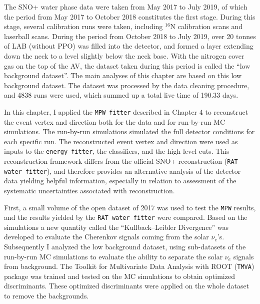 
The SNO+ water phase data were taken from May 2017 to July 2019, of which the period from May 2017 to October 2018 constitutes the first stage. During this stage, several calibration runs were taken, including $^{16}$N calibration scans and laserball scans. During the period from October 2018 to July 2019, over 20 tonnes of LAB (without PPO) was filled into the detector, and formed a layer extending down the neck to a level slightly below the neck base. With the nitrogen cover gas on the top of the AV, the dataset taken during this period is called the ``low background dataset''. The main analyses of this chapter are based on this low background dataset. The dataset was processed by the data cleaning procedure, and 4838 runs were used, which summed up a total live time of 190.33 days.

In this chapter, I applied the \texttt{MPW fitter} described in Chapter 4 to reconstruct the event vertex and direction both for the data and for run-by-run MC simulations. The run-by-run simulations simulated the full detector conditions for each specific run. The reconstructed event vertex and direction were used as inputs to the \texttt{energy fitter}, the classifiers, and the high level cuts. This reconstruction framework differs from the official SNO+ reconstruction (\texttt{RAT water fitter}), and therefore provides an alternative analysis of the detector data yielding helpful information, especially in relation to assessment of the systematic uncertainties associated with reconstruction.

First, a small volume of the open dataset of 2017 was used to test the \texttt{MPW} results, and the results yielded by the \texttt{RAT water fitter} were compared. Based on the simulations a new quantity called the ``Kullback–Leibler Divergence'' was developed to evaluate the Cherenkov signals coming from the solar $\nu_e$'s. Subsequently I analyzed the low background dataset, using sub-datasets of the run-by-run MC simulations to evaluate the ability to separate the solar $\nu_e$ signals from background. The Toolkit for Multivariate Data Analysis with ROOT (\texttt{TMVA}) package \cite{tmvaWebsite,albertsson2007tmva} was trained and tested on the MC simulations to obtain optimized discriminants. These optimized discriminants were applied on the whole dataset to remove the backgrounds.

